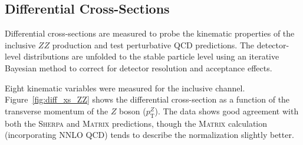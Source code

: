 \subsection{Differential Cross-Sections}
\label{subsec:diff_xsec}

Differential cross-sections are measured to probe the kinematic properties of the inclusive $ZZ$ production and test perturbative QCD predictions. The detector-level distributions are unfolded to the stable particle level using an iterative Bayesian method to correct for detector resolution and acceptance effects.

Eight kinematic variables were measured for the inclusive channel. Figure~\ref{fig:diff_xs_ZZ} shows the differential cross-section as a function of the transverse momentum of the $Z$ boson ($p_{\mathrm{T}}^Z$). The data shows good agreement with both the \textsc{Sherpa} and \textsc{Matrix} predictions, though the \textsc{Matrix} calculation (incorporating NNLO QCD) tends to describe the normalization slightly better.


